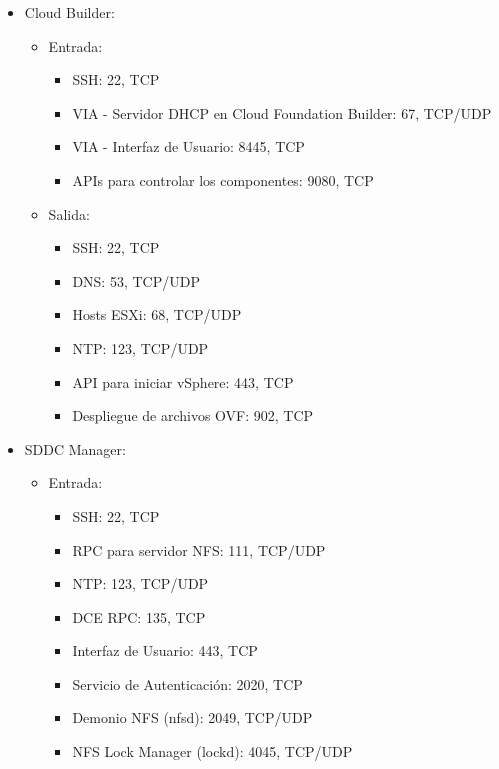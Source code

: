 \iffalse
\begin{itemize}
\item Cloud Builder:
    \begin{itemize}
        \item Entrada:
            \begin{itemize}
                \item SSH: 22, TCP
                \item VIA - Servidor DHCP en Cloud Foundation Builder: 67, TCP/UDP
                \item VIA - Interfaz de Usuario: 8445, TCP
                \item APIs para controlar los componentes: 9080, TCP
            \end{itemize}
        \item Salida:
            \begin{itemize}
                \item SSH: 22, TCP
                \item DNS: 53, TCP/UDP
                \item Hosts ESXi: 68, TCP/UDP
                \item NTP: 123, TCP/UDP
                \item API para iniciar vSphere: 443, TCP
                \item Despliegue de archivos OVF: 902, TCP
            \end{itemize}
    \end{itemize}
\item SDDC Manager:
        \begin{itemize}
        \item Entrada:
            \begin{itemize}
                \item SSH: 22, TCP
                \item RPC para servidor NFS: 111, TCP/UDP
                \item NTP: 123, TCP/UDP
                \item DCE RPC: 135, TCP
                \item Interfaz de Usuario: 443, TCP
                \item Servicio de Autenticación: 2020, TCP
                \item Demonio NFS (nfsd): 2049, TCP/UDP
                \item NFS Lock Manager (lockd): 4045, TCP/UDP

\end{itemize}
\end{itemize}
\end{itemize}
